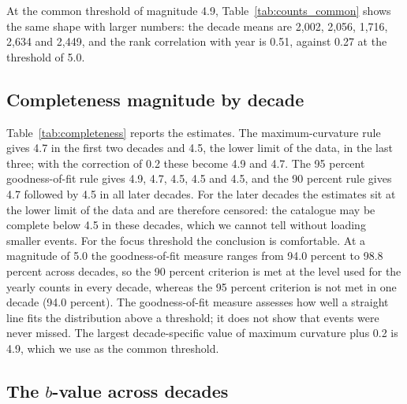 \documentclass[11pt]{article}
\begin{document}
At the common threshold of magnitude 4.9, Table~\ref{tab:counts_common} shows the same shape with larger numbers: the decade means are 2,002, 2,056, 1,716, 2,634 and 2,449, and the rank correlation with year is 0.51, against 0.27 at the threshold of 5.0.



\subsection{Completeness magnitude by decade}

Table~\ref{tab:completeness} reports the estimates. The maximum-curvature rule gives 4.7 in the first two decades and 4.5, the lower limit of the data, in the last three; with the correction of 0.2 these become 4.9 and 4.7. The 95 percent goodness-of-fit rule gives 4.9, 4.7, 4.5, 4.5 and 4.5, and the 90 percent rule gives 4.7 followed by 4.5 in all later decades.
For the later decades the estimates sit at the lower limit of the data and are therefore censored: the catalogue may be complete below 4.5 in these decades, which we cannot tell without loading smaller events. For the focus threshold the conclusion is comfortable. At a magnitude of 5.0 the goodness-of-fit measure ranges from 94.0 percent to 98.8 percent across decades, so the 90 percent criterion is met at the level used for the yearly counts in every decade, whereas the 95 percent criterion is not met in one decade (94.0 percent). The goodness-of-fit measure assesses how well a straight line fits the distribution above a threshold; it does not show that events were never missed.
The largest decade-specific value of maximum curvature plus 0.2 is 4.9, which we use as the common threshold.



\subsection{The $b$-value across decades}
\end{document}

